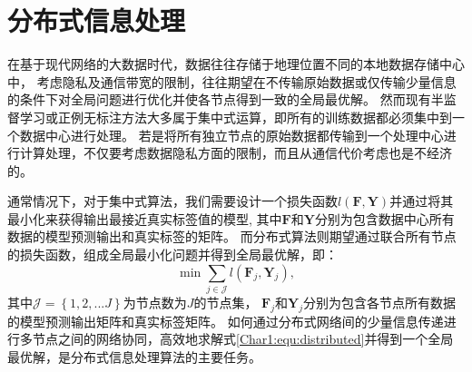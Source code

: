 
\section{分布式信息处理}
在基于现代网络的大数据时代，数据往往存储于地理位置不同的本地数据存储中心中，
考虑隐私及通信带宽的限制，往往期望在不传输原始数据或仅传输少量信息的条件下对全局问题进行优化并使各节点得到一致的全局最优解。
然而现有半监督学习或正例无标注方法大多属于集中式运算，即所有的训练数据都必须集中到一个数据中心进行处理。
若是将所有独立节点的原始数据都传输到一个处理中心进行计算处理，不仅要考虑数据隐私方面的限制，而且从通信代价考虑也是不经济的。

通常情况下，对于集中式算法，我们需要设计一个损失函数$l\left(\boldsymbol F, \boldsymbol Y\right)$并通过将其最小化来获得输出最接近真实标签值的模型,
其中$\boldsymbol F$和$\boldsymbol Y$分别为包含数据中心所有数据的模型预测输出和真实标签的矩阵。
而分布式算法则期望通过联合所有节点的损失函数，组成全局最小化问题并得到全局最优解，即：
\begin{equation}
    \label{Char1:equ:distributed}
    \min \sum_{j\in\mathcal{J}} l\left(\boldsymbol F_j, \boldsymbol Y_j\right),
\end{equation}
其中$\mathcal{J}=\left\{1,2,...J\right\}$为节点数为$J$的节点集，
$\boldsymbol F_j$和$\boldsymbol Y_j$分别为包含各节点所有数据的模型预测输出矩阵和真实标签矩阵。
如何通过分布式网络间的少量信息传递进行多节点之间的网络协同，高效地求解式\eqref{Char1:equ:distributed}并得到一个全局最优解，是分布式信息处理算法的主要任务。


